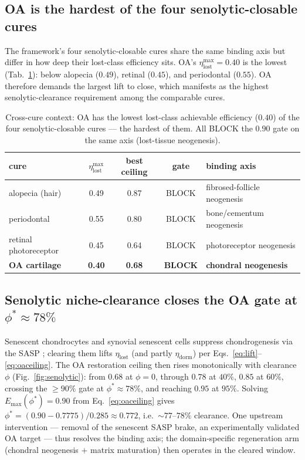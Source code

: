 \documentclass[11pt,a4paper]{article}
\begin{document}
\subsection{OA is the hardest of the four senolytic-closable cures}
The framework's four senolytic-closable cures share the same binding axis but differ in
how deep their lost-class efficiency sits. OA's $\eta_{\text{lost}}^{\max}=0.40$ is the
lowest (Tab.~\ref{tab:cross}): below alopecia ($0.49$), retinal ($0.45$), and periodontal
($0.55$). OA therefore demands the largest lift to close, which manifests as the highest
senolytic-clearance requirement among the comparable cures.

\begin{table}[h]\centering\small
\begin{tabular}{lcccl}
\toprule
\textbf{cure} & $\eta_{\text{lost}}^{\max}$ & best ceiling & gate & binding axis \\
\midrule
alopecia (hair) & 0.49 & 0.87 & BLOCK & fibrosed-follicle neogenesis \\
periodontal & 0.55 & 0.80 & BLOCK & bone/cementum neogenesis \\
retinal photoreceptor & 0.45 & 0.64 & BLOCK & photoreceptor neogenesis \\
\textbf{OA cartilage} & \textbf{0.40} & \textbf{0.68} & \textbf{BLOCK} & \textbf{chondral neogenesis} \\
\bottomrule
\end{tabular}
\caption{Cross-cure context: OA has the lowest lost-class achievable efficiency
($0.40$) of the four senolytic-closable cures --- the hardest of them. All BLOCK the
$0.90$ gate on the same axis (lost-tissue neogenesis).}
\label{tab:cross}
\end{table}

\subsection{Senolytic niche-clearance closes the OA gate at \texorpdfstring{$\phi^\ast\!\approx\!78\%$}{phi*~78\%}}
\label{sec:senolytic}
Senescent chondrocytes and synovial senescent cells suppress chondrogenesis via the SASP
\citep{coryell2021,loeser2016}; clearing them lifts $\eta_{\text{lost}}$ (and partly
$\eta_{\text{dorm}}$) per Eqs.~\eqref{eq:lift}--\eqref{eq:oaceiling}. The OA restoration
ceiling then rises monotonically with clearance $\phi$ (Fig.~\ref{fig:senolytic}): from
$0.68$ at $\phi=0$, through $0.78$ at $40\%$, $0.85$ at $60\%$, crossing the $\geq 90\%$
gate at $\phi^\ast\!\approx\!78\%$, and reaching $0.95$ at $95\%$. Solving
$E_{\max}(\phi^\ast)=0.90$ from Eq.~\eqref{eq:oaceiling} gives
$\phi^\ast=(0.90-0.7775)/0.285\approx 0.772$, i.e.\ ${\sim}77$--$78\%$ clearance. One
upstream intervention --- removal of the senescent SASP brake, an experimentally
validated OA target \citep{jeon2017} --- thus resolves the binding axis; the
domain-specific regeneration arm (chondral neogenesis $+$ matrix maturation) then operates
in the cleared window.
\end{document}
